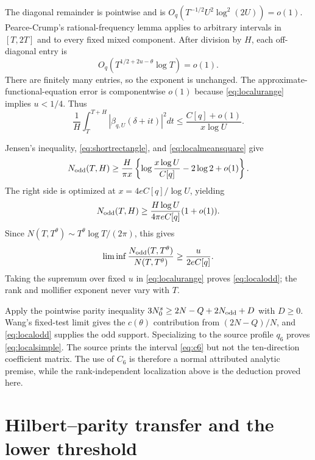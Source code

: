 ﻿\documentclass[11pt]{article}
\theoremstyle{remark}
\begin{document}
The diagonal remainder is pointwise and is
$O_q(T^{-1/2}U^2\log^2(2U))=o(1)$. Pearce-Crump's rational-frequency lemma
applies to arbitrary intervals in $[T,2T]$ and to every fixed mixed component.
After division by $H$, each off-diagonal entry is
\begin{equation}\label{eq:localoffdiagonal}
 O_q\!\left(T^{1/2+2u-\theta}\log T\right)=o(1).
\end{equation}
There are finitely many entries, so the exponent is unchanged. The
approximate-functional-equation error is componentwise $o(1)$ because
\eqref{eq:localurange} implies $u<1/4$. Thus
\begin{equation}\label{eq:localmeansquare}
 \frac1H\int_T^{T+H}|\beta_{q,U}(\delta+it)|^2dt
 \le\frac{C[q]+o(1)}{x\log U}.
\end{equation}

Jensen's inequality, \eqref{eq:shortrectangle}, and
\eqref{eq:localmeansquare} give
\[
 N_{\rm odd}(T,H)\ge\frac{H}{\pi x}
 \left\{\log\frac{x\log U}{C[q]}-2\log2+o(1)\right\}.
\]
The right side is optimized at $x=4eC[q]/\log U$, yielding
\begin{equation}\label{eq:localsignchanges}
 N_{\rm odd}(T,H)\ge
 \frac{H\log U}{4\pi eC[q]}(1+o(1)).
\end{equation}
Since $N(T,T^\theta)\sim T^\theta\log T/(2\pi)$, this gives
\[
 \liminf\frac{N_{\rm odd}(T,T^\theta)}{N(T,T^\theta)}
 \ge\frac{u}{2eC[q]}.
\]
Taking the supremum over fixed $u$ in \eqref{eq:localurange} proves
\eqref{eq:localodd}; the rank and mollifier exponent never vary with $T$.

Apply the pointwise parity inequality
$3N_0^s\ge2N-Q+2N_{\rm odd}+D$ with $D\ge0$. Wang's fixed-test limit gives
the $c(\theta)$ contribution from $(2N-Q)/N$, and \eqref{eq:localodd}
supplies the odd support. Specializing to the source profile $q_6$ proves
\eqref{eq:localsimple}. The source prints the interval \eqref{eq:c6} but not
the ten-direction coefficient matrix. The use of $C_6$ is therefore a normal
attributed analytic premise, while the rank-independent localization above is
the deduction proved here.

\section{Hilbert--parity transfer and the lower threshold}
\label{sec:hilberttransfer}
\end{document}
